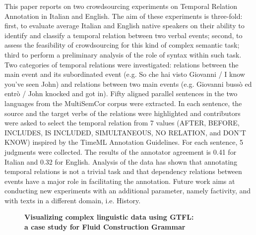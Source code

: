 \documentclass[10pt, a4paper, twopage, headinclude, footinclude, BCOR5mm]{scrartcl}
\begin{document}
\noindent
This paper reports on two crowdsourcing experiments on Temporal Relation Annotation in Italian and English. The aim of these experiments is three-fold: first, to evaluate average Italian and English native speakers on their ability to identify and classify a temporal relation between two verbal events; second, to assess the feasibility of crowdsourcing for this kind of complex semantic task; third to perform a preliminary analysis of the role of syntax within such task. Two categories of temporal relations were investigated: relations between the main event and its subordinated event (e.g. So che hai visto Giovanni / I know you’ve seen John) and relations between two main events (e.g. Giovanni bussò ed entrò / John knocked and got in). Fifty aligned parallel sentences in the two languages from the MultiSemCor corpus were extracted. In each sentence, the source and the target verbs of the relations were highlighted and contributors were asked to select the temporal relation from 7 values (AFTER, BEFORE, INCLUDES, IS INCLUDED, SIMULTANEOUS, NO RELATION, and DON’T KNOW) inspired by the TimeML Annotation Guidelines. For each sentence, 5 judgments were collected. The results of the annotator agreement is 0.41 for Italian and 0.32 for English. Analysis of the data has shown that annotating temporal relations is not a trivial task and that dependency relations between events have a major role in facilitating the annotation. Future work aims at conducting new experiments with an additional parameter, namely factivity, and with texts in a different domain, i.e. History. 


\newpage

\begin{figure}[t!]
\centering
\large\textbf{Visualizing complex linguistic data using GTFL: \\ a case study for Fluid Construction Grammar}
\vspace*{0.5cm}
\end{figure}


        \begin{table}[t!]
    \end{table}
\end{document}
